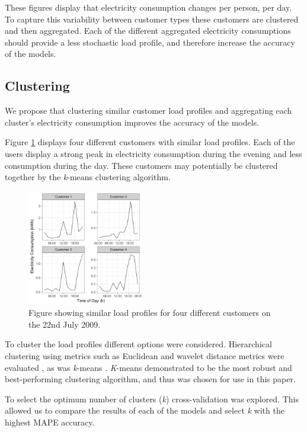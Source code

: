 These figures display that electricity consumption changes per person, per day. To capture this variability between customer types these customers are clustered and then aggregated. Each of the different aggregated electricity consumptions should provide a less stochastic load profile, and therefore increase the accuracy of the models.

\subsection{Clustering}

We propose that clustering similar customer load profiles and aggregating each cluster's electricity consumption improves the accuracy of the models. 

Figure \ref{fig:similar_customers} displays four different customers with similar load profiles. Each of the users display a strong peak in electricity consumption during the evening and less consumption during the day. These customers may potentially be clustered together by the \textit{k}-means clustering algorithm.

\begin{figure}[b]
	\includegraphics[width=0.45\textwidth]{figures/similar_cust.png}
	\caption{Figure showing similar load profiles for four different customers on the 22nd July 2009.}
	\label{fig:similar_customers}
\end{figure}

To cluster the load profiles different options were considered. Hierarchical clustering using metrics such as Euclidean and wavelet distance metrics were evaluated \cite{BIMJ:BIMJ4710240520}, as was \textit{k}-means \cite{Forgy65}.\textit{ K}-means demonstrated to be the most robust and best-performing clustering algorithm, and thus was chosen for use in this paper.

To select the optimum number of clusters (\textit{k}) cross-validation was explored. This allowed us to compare the results of each of the models and select \textit{k} with the highest MAPE accuracy.

